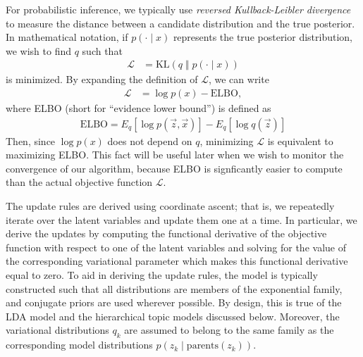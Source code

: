 \documentclass{article}
\begin{document}
For probabilistic inference, we typically use \emph{reversed Kullback-Leibler divergence} to measure the distance between a candidate distribution and the true posterior.
In mathematical notation, if $p(\cdot \mid x)$ represents the true posterior distribution, we wish to find $q$ such that
\begin{align}
\mathcal L &= \text{KL}( q \;\Vert\; p(\cdot \mid x) )
\end{align}
is minimized.
By expanding the definition of $\mathcal L$, we can write
\begin{align}
\mathcal L &= \log p(x) - \text{ELBO},
\end{align}
where ELBO (short for ``evidence lower bound'') is defined as
\begin{align}
\text{ELBO} = E_q[\log p(\vec z, \vec x)] - E_q[\log q(\vec z)]
\end{align}
Then, since $\log p(x)$ does not depend on $q$, minimizing $\mathcal L$ is equivalent to maximizing ELBO.
This fact will be useful later when we wish to monitor the convergence of our algorithm, because ELBO is signficantly easier to compute than the actual objective function $\mathcal L$.

The update rules are derived using coordinate ascent; that is, we repeatedly iterate over the latent variables and update them one at a time.
In particular, we derive the updates by computing the functional derivative of the objective function with respect to one of the latent variables and solving for the value of the corresponding variational parameter which makes this functional derivative equal to zero.
To aid in deriving the update rules, the model is typically constructed such that all distributions are members of the exponential family, and conjugate priors are used wherever possible.
By design, this is true of the LDA model and the hierarchical topic models discussed below.
Moreover, the variational distributions $q_k$ are assumed to belong to the same family as the corresponding model distributions $p(z_k \mid \text{parents}(z_k))$.
\end{document}
